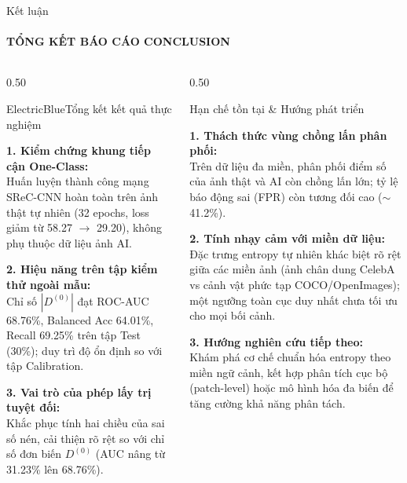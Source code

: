 \documentclass[aspectratio=169, 10pt, t]{beamer}
\begin{document}
\begin{frame}{Kết luận}
  \framesubtitle{TỔNG KẾT BÁO CÁO \;\textbar\; CONCLUSION}
  \begin{columns}[t]
    \begin{column}{0.50\textwidth}
      \begin{accentbox}[equal height group=conc]{ElectricBlue}{Tổng kết kết quả thực nghiệm}
        \raggedright\scriptsize
        \textbf{1. Kiểm chứng khung tiếp cận One-Class:}\\
        Huấn luyện thành công mạng SReC-CNN hoàn toàn trên ảnh thật tự nhiên (32 epochs, loss giảm từ 58.27 $\to$ 29.20), không phụ thuộc dữ liệu ảnh AI.
        \vspace{0.22em}

        \textbf{2. Hiệu năng trên tập kiểm thử ngoài mẫu:}\\
        Chỉ số $|D^{(0)}|$ đạt ROC-AUC 68.76\%, Balanced Acc 64.01\%, Recall 69.25\% trên tập Test (30\%); duy trì độ ổn định so với tập Calibration.
        \vspace{0.22em}

        \textbf{3. Vai trò của phép lấy trị tuyệt đối:}\\
        Khắc phục tính hai chiều của sai số nén, cải thiện rõ rệt so với chỉ số đơn biến $D^{(0)}$ (AUC nâng từ 31.23\% lên 68.76\%).
      \end{accentbox}
    \end{column}
    \begin{column}{0.50\textwidth}
      \begin{cleanbox}[equal height group=conc]{Hạn chế tồn tại \& Hướng phát triển}
        \raggedright\scriptsize
        \textbf{1. Thách thức vùng chồng lấn phân phối:}\\
        Trên dữ liệu đa miền, phân phối điểm số của ảnh thật và AI còn chồng lấn lớn; tỷ lệ báo động sai (FPR) còn tương đối cao ($\sim$41.2\%).
        \vspace{0.22em}

        \textbf{2. Tính nhạy cảm với miền dữ liệu:}\\
        Đặc trưng entropy tự nhiên khác biệt rõ rệt giữa các miền ảnh (ảnh chân dung CelebA vs cảnh vật phức tạp COCO/OpenImages); một ngưỡng toàn cục duy nhất chưa tối ưu cho mọi bối cảnh.
        \vspace{0.22em}

        \textbf{3. Hướng nghiên cứu tiếp theo:}\\
        Khám phá cơ chế chuẩn hóa entropy theo miền ngữ cảnh, kết hợp phân tích cục bộ (patch-level) hoặc mô hình hóa đa biến để tăng cường khả năng phân tách.
      \end{cleanbox}
    \end{column}
  \end{columns}
\end{frame}
\end{document}
